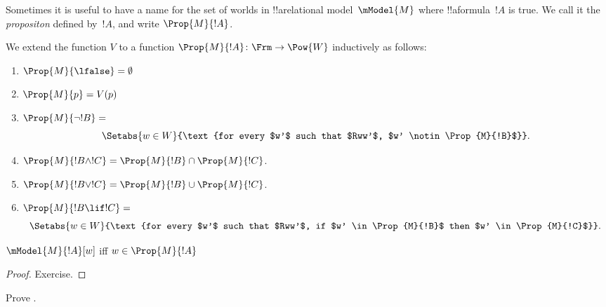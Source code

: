 \documentclass[../../../include/open-logic-section]{subfiles}
\begin{document}


Sometimes it is useful to have a name for the set of worlds in
!!a{relational model}~$\mModel{M}$ where !!a{formula}~$!A$ is true. We
call it the \emph{propositon} defined by~$!A$, and write
$\Prop{M}{!A}$. 

\begin{defn}
  We extend the function $V$ to a function $\Prop{M}{!A} \colon \Frm
  \to \Pow{W}$ inductively as follows:
  \begin{enumerate}
  \item $\Prop{M}{\lfalse} = \emptyset$
  \item $\Prop{M}{p} = V(p)$
  \item $\Prop{M}{\lnot !B} = {}$
    \[
      \Setabs{w \in W}{\text{for every $w'$ such that $Rww'$, $w'
          \notin \Prop{M}{!B}$}}.
    \]
  \item $\Prop{M}{!B \land !C} = \Prop{M}{!B} \cap \Prop{M}{!C}$.
  \item $\Prop{M}{!B \lor !C} = \Prop{M}{!B} \cup \Prop{M}{!C}$.
  \item $\Prop{M}{!B \lif !C} = {}$
    \[
      \Setabs{w \in W}{\text{for every $w'$ such that $Rww'$, if $w'
          \in \Prop{M}{!B}$ then $w' \in \Prop{M}{!C}$}}.
    \]
  \end{enumerate}
\end{defn}

\begin{prop}
  $\mModel{M}{!A}[w]$ iff $w \in \Prop{M}{!A}$
\end{prop}

\begin{proof}
  Exercise.
\end{proof}

\begin{prob}
  Prove .
\end{prob}
\end{document}
